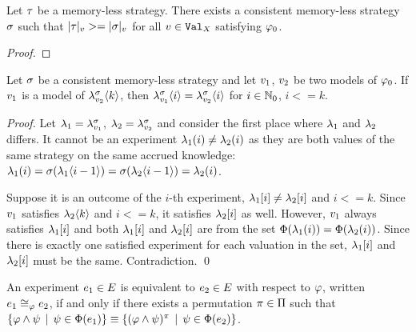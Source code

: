 \begin{lemma}
Let $\tau$ be a memory-less strategy.
There exists a consistent memory-less strategy $\sigma$ such that
  $|\tau|_{v} >= |\sigma|_{v}$ for all $v\in\mathtt{Val}_X$ satisfying $\varphi_0$.
\end{lemma}

\begin{proof}
\end{proof}

\begin{lemma} \label{lma-accruedknowledge}
Let $\sigma$ be a consistent memory-less strategy and let $v_1$, $v_2$ be two models of $\varphi_0$.
If $v_1$ is a model of $\lambda^{\sigma}_{v_2}\langle k\rangle$,
  then $\lambda^{\sigma}_{v_1}\langle i\rangle = \lambda^{\sigma}_{v_2}\langle i\rangle$
  for $i \in\mathbb{N}_0$, $i <= k$.
\end{lemma}

\begin{proof}
Let $\lambda_1 = \lambda^{\sigma}_{v_1}$, $\lambda_2 = \lambda^{\sigma}_{v_2}$
and consider the first place where $\lambda_1$ and $\lambda_2$ differs.
It cannot be an experiment $\lambda_1(i) \not= \lambda_2(i)$ as they are both
  values of the same strategy on the same accrued knowledge:
$\lambda_1(i) = \sigma(\lambda_1\langle i-1\rangle) =
              \sigma(\lambda_2\langle i-1\rangle) = \lambda_2(i)$.

Suppose it is an outcome of the $i$-th experiment, $\lambda_1[i] \not= \lambda_2[i]$
  and $i <= k$.
Since $v_1$ satisfies $\lambda_2\langle k\rangle$ and $i <= k$,
  it satisfies $\lambda_2[i]$ as well.
However, $v_1$ always satisfies $\lambda_1[i]$ and
  both $\lambda_1[i]$ and $\lambda_2[i]$ are from the set
  $\Phi(\lambda_1(i)) = \Phi(\lambda_2(i))$.
Since there is exactly one satisfied experiment for each valuation in the set,
  $\lambda_1[i]$ and $\lambda_2[i]$ must be the same.
Contradiction. \qed
\end{proof}

\begin{definition}
An experiment $e_1\in E$ is equivalent to $e_2\in E$ with respect to $\varphi$,
  written $e_1\cong_{\varphi}e_2$,
  if and only if there exists a permutation $\pi\in\Pi$ such that %
 $ \{ \varphi\wedge\psi \:\:|\:\: \psi\in\Phi(e_1) \} \equiv
   \{ (\varphi\wedge\psi)^\pi \:\:|\:\: \psi\in\Phi(e_2) \} $.
\end{definition}

